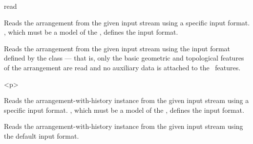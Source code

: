 

\begin{ccRefFunction}{read}


   {Reads the arrangement  from the given input stream using a
    specific input format. , which must be a model of the
    , defines the input format.}

   {Reads the arrangement  from the given input stream using the
    input format defined by the  class --- that is,
    only the basic geometric and topological features of the arrangement are
    read and no auxiliary data is attached to the \dcel\ features.}

\begin{ccHtmlOnly}<p>\end{ccHtmlOnly}

   {Reads the arrangement-with-history instance  from the given 
    input stream using a specific input format. , which must
    be a model of the , defines the input
    format.}

   {Reads the arrangement-with-history instance  from the given
    input stream using the default input format.}

\ccSeeAlso

\end{ccRefFunction}

\ccRefPageEnd

